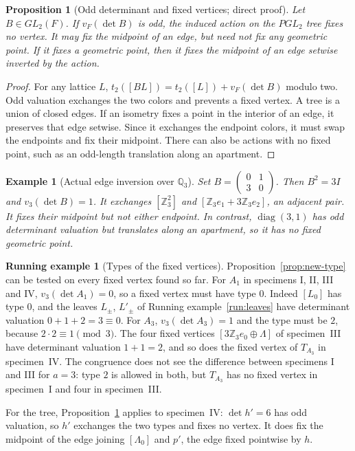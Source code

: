 \documentclass[12pt,letterpaper]{amsart}
\numberwithin{equation}{section}
\newtheorem{proposition}[theorem]{Proposition}
\newtheorem{example}[theorem]{Example}
\theoremstyle{definition}
\newtheorem{runex}[theorem]{Running example}
\theoremstyle{plain}
\begin{document}
\begin{proposition}[Odd determinant and fixed vertices; direct proof]
\label{prop:new-tree-parity}
Let $B\in GL_2(F)$. If $v_F(\det B)$ is odd, the induced
action on the $PGL_2$ tree fixes no vertex. It may fix the
midpoint of an edge, but need not fix any geometric point. If it
fixes a geometric point, then it fixes the midpoint of an edge
setwise inverted by the action.
\end{proposition}
\begin{proof}
For any lattice $L$, $t_2([BL])=t_2([L])+v_F(\det B)$
modulo two. Odd valuation exchanges the two colors and prevents a
fixed vertex. A tree is a union of closed edges. If an isometry
fixes a point in the interior of an edge, it preserves that edge
setwise. Since it exchanges the endpoint colors, it must swap the
endpoints and fix their midpoint. There can also be actions with
no fixed point, such as an odd-length translation along an apartment.
\end{proof}

\begin{example}[Actual edge inversion over $\mathbb Q_3$]
\label{ex:new-edge}
Set $B=\left(\begin{smallmatrix}0&1\\3&0\end{smallmatrix}\right)$.
Then $B^2=3I$ and $v_3(\det B)=1$.
It exchanges $[\mathbb Z_3^2]$ and
$[\mathbb Z_3 e_1+3\mathbb Z_3 e_2]$, an adjacent pair.
It fixes their midpoint but not either endpoint. In contrast,
$\operatorname{diag}(3,1)$ has odd determinant valuation but
translates along an apartment, so it has no fixed geometric point.
\end{example}

\begin{runex}[Types of the fixed vertices]
\label{run:types}
Proposition~\ref{prop:new-type} can be tested on every fixed vertex
found so far. For $A_1$ in specimens I, II, III and IV,
$v_3(\det A_1)=0$, so a fixed vertex must have type $0$. Indeed
$[L_0]$ has type $0$, and the leaves $L_\pm$, $L'_\pm$ of
Running example~\ref{run:leaves} have determinant valuation
$0+1+2=3\equiv0$. For $A_3$, $v_3(\det A_3)=1$ and the type must be
$2$, because $2\cdot2\equiv1\pmod3$. The four fixed vertices
$[3\mathbb Z_3e_0\oplus\Lambda]$ of specimen~III have determinant
valuation $1+1=2$, and so does the fixed vertex of $T_{A_3}$ in
specimen~IV. The congruence does not see the difference between
specimens I and III for $a=3$: type $2$ is allowed in both, but
$T_{A_3}$ has no fixed vertex in specimen~I and four in specimen~III.

For the tree, Proposition~\ref{prop:new-tree-parity} applies to
specimen~IV: $\det h'=6$ has odd valuation, so $h'$ exchanges the two
types and fixes no vertex. It does fix the midpoint of the edge
joining $[\Lambda_0]$ and $p'$, the edge fixed pointwise by $h$.
\end{runex}
\end{document}

